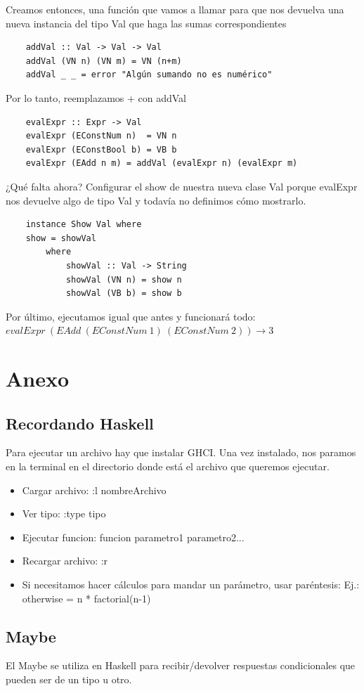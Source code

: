 \documentclass[10pt,a4paper]{article}
\begin{document}
Creamos entonces, una función que vamos a llamar para que nos devuelva una nueva instancia del tipo Val que haga las sumas correspondientes
\begin{lstlisting}
    addVal :: Val -> Val -> Val 
    addVal (VN n) (VN m) = VN (n+m)
    addVal _ _ = error "Algún sumando no es numérico"
\end{lstlisting}
Por lo tanto, reemplazamos + con addVal 
\begin{lstlisting}
    evalExpr :: Expr -> Val
    evalExpr (EConstNum n)  = VN n
    evalExpr (EConstBool b) = VB b
    evalExpr (EAdd n m) = addVal (evalExpr n) (evalExpr m)
\end{lstlisting}
¿Qué falta ahora? Configurar el show de nuestra nueva clase Val porque evalExpr nos devuelve algo de tipo Val y todavía no definimos cómo mostrarlo. 
\begin{lstlisting}
    instance Show Val where 
    show = showVal 
        where 
            showVal :: Val -> String 
            showVal (VN n) = show n
            showVal (VB b) = show b
\end{lstlisting}
Por último, ejecutamos igual que antes y funcionará todo: $evalExpr \ (EAdd \ (EConstNum \ 1) \ (EConstNum \ 2)) \rightarrow 3$
\section*{Anexo}
\subsection*{Recordando Haskell}
Para ejecutar un archivo hay que instalar GHCI. Una vez instalado, nos paramos en la terminal en el directorio donde está el archivo que queremos ejecutar. 
\begin{itemize}
    \item Cargar archivo: :l nombreArchivo
    \item Ver tipo: :type tipo 
    \item Ejecutar funcion: funcion parametro1 parametro2...
    \item Recargar archivo: :r
    \item Si necesitamos hacer cálculos para mandar un parámetro, usar paréntesis: Ej.: otherwise = n * factorial(n-1)
\end{itemize} 
\subsection*{Maybe}
El Maybe se utiliza en Haskell para recibir/devolver respuestas condicionales que pueden ser de un tipo u otro. \\
\end{document}
